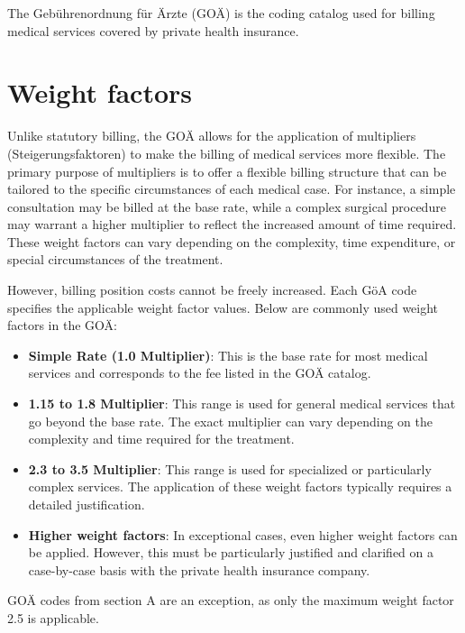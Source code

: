 The Gebührenordnung für Ärzte (GOÄ) is the coding catalog used for billing medical services covered by private health insurance.

\section{Weight factors}\label{sec:weight-factors}

Unlike statutory billing, the GOÄ allows for the application of multipliers (Steigerungsfaktoren) to make the billing of medical services more flexible.
The primary purpose of multipliers is to offer a flexible billing structure that can be tailored to the specific circumstances of each medical case.
For instance, a simple consultation may be billed at the base rate, while a complex surgical procedure may warrant a higher multiplier to reflect the increased amount of time required.
These weight factors can vary depending on the complexity, time expenditure, or special circumstances of the treatment.

However, billing position costs cannot be freely increased.
Each GöA code specifies the applicable weight factor values.
Below are commonly used weight factors in the GOÄ\cite[]{bruck1998kommentar}:

\begin{itemize}
    \item \textbf{Simple Rate (1.0 Multiplier)}: This is the base rate for most medical services and corresponds to the fee listed in the GOÄ catalog.
    \item \textbf{1.15 to 1.8 Multiplier}: This range is used for general medical services that go beyond the base rate.
    The exact multiplier can vary depending on the complexity and time required for the treatment.
    \item \textbf{2.3 to 3.5 Multiplier}: This range is used for specialized or particularly complex services.
    The application of these weight factors typically requires a detailed justification.
    \item \textbf{Higher weight factors}: In exceptional cases, even higher weight factors can be applied.
    However, this must be particularly justified and clarified on a case-by-case basis with the private health insurance company.
\end{itemize}

GOÄ codes from section A are an exception, as only the maximum weight factor 2.5 is applicable\cite[]{hermanns2011gebuhrenordnung}.

